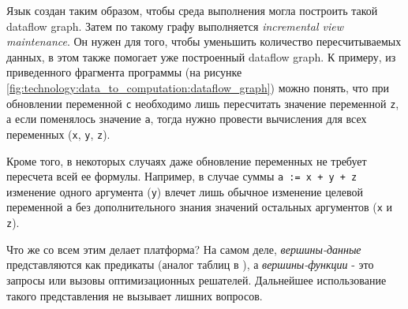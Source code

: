 Язык создан таким образом, чтобы среда выполнения могла построить такой dataflow graph. Затем по такому графу выполняется \emph{incre\-men\-tal view maintenance}. Он нужен для того, чтобы уменьшить количество пересчитываемых данных, в этом также помогает уже построенный dataflow graph. К примеру, из приведенного фрагмента программы (на рисунке \ref{fig:technology:data_to_computation:dataflow_graph}) можно понять, что при обновлении переменной \lstinline{c} необходимо лишь пересчитать значение переменной \lstinline{z}, а если поменялось значение \lstinline{a}, тогда нужно провести вычисления для всех переменных (\lstinline{x}, \lstinline{y}, \lstinline{z}).

Кроме того, в некоторых случаях даже обновление переменных не требует пересчета всей ее формулы. Например, в случае суммы \lstinline{a := x + y + z} изменение одного аргумента (\lstinline{y}) влечет лишь обычное изменение целевой переменной \lstinline{a} без дополнительного знания значений остальных аргументов (\lstinline{x} и \lstinline{z}).

Что же со всем этим делает платформа? На самом деле, \emph{вершины-данные} представляются как предикаты (аналог таблиц в \sql), а \emph{вершины-функции} - это запросы или вызовы оптимизационных решателей. Дальнейшее использование такого представления не вызывает лишних вопросов.
